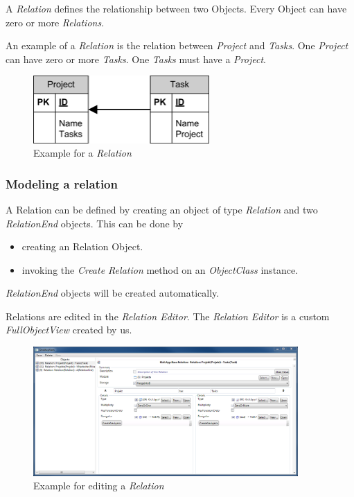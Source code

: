 A \emph{Relation} defines the relationship between two Objects. Every Object can have zero or more \emph{Relations}.

An example of a \emph{Relation} is the relation between \emph{Project} and \emph{Tasks}. One \emph{Project} can have zero or more \emph{Tasks}. One \emph{Tasks} must have a \emph{Project}.

\begin{figure}[ht]
	\begin{center}
		\includegraphics[width=0.6\textwidth]{images/Rel_1_n_Project_Tasks.png}
		\caption{Example for a \emph{Relation}}
		\label{example_for_relation}
	\end{center}
\end{figure}


\subsubsection{Modeling a relation}
A Relation can be defined by creating an object of type \emph{Relation} and two \emph{RelationEnd} objects. This can be done by
\begin{itemize}
	\item creating an Relation Object. 
	\item invoking the \emph{Create Relation} method on an \emph{ObjectClass} instance.
\end{itemize}

\emph{RelationEnd} objects will be created automatically.

\par
Relations are edited in the \emph{Relation Editor}. The \emph{Relation Editor} is a custom \emph{FullObjectView} created by us.

\begin{figure}[ht]
	\begin{center}
		\includegraphics[width=0.9\textwidth]{images/ScreenShot_Rel_Project_Task.png}
		\caption{Example for editing a \emph{Relation}}
		\label{example_for_editing_relation}
	\end{center}
\end{figure}

